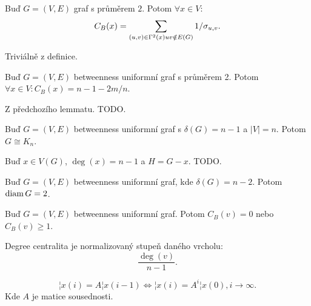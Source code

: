 \documentclass[12pt]{article}					%
\begin{document}
    \begin{lemma}
        Buď $G = (V, E)$ graf s průměrem $2$. Potom $\forall x \in V:$
        $$ C_B(x) = \sum_{(u, v) \in \Gamma^2(x) \\ uv \notin E(G)} 1/\sigma_{u,v}. $$

        \begin{dukazin}
            Triviálně z definice.
        \end{dukazin}
    \end{lemma}

    \begin{lemma}
        Buď $G = (V, E)$ betweenness uniformní graf s průměrem 2. Potom $\forall x \in V: C_B(x) = n - 1 - 2m/n$.

        \begin{dukazin}
            Z předchozího lemmatu. TODO.
        \end{dukazin}
    \end{lemma}

    \begin{veta}
        Buď $G = (V, E)$ betweenness uniformní graf s $\delta(G) = n-1$ a $|V| = n$. Potom $G \cong K_n$.

        \begin{dukazin}
            Buď $x \in V(G)$, $\deg(x) = n-1$ a $H = G - x$. TODO.
        \end{dukazin}
    \end{veta}

    \begin{veta}
        Buď $G = (V, E)$ betweenness uniformní graf, kde $\delta(G) = n-2$. Potom $\operatorname{diam} G = 2$.
    \end{veta}

    \begin{veta}
        Buď $G = (V, E)$ betweenness uniformní graf. Potom $C_B(v) = 0$ nebo $C_B(v) ≥ 1$.
    \end{veta}


    \begin{definice}
        Degree centralita je normalizovaný stupeň daného vrcholu:
        $$ \frac{\deg(v)}{n - 1}. $$ 
    \end{definice}

    \begin{definice}
        $$ ¦x(i) = A¦x(i-1) \Leftrightarrow ¦x(i) = A^i¦x(0), i \rightarrow ∞. $$
        Kde $A$ je matice sousednosti.
    \end{definice}
\end{document}
